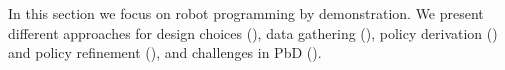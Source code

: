 In this section we focus on robot programming by demonstration.
We present different approaches for design choices (), data gathering (), policy derivation () and policy refinement (), and challenges in PbD ().







